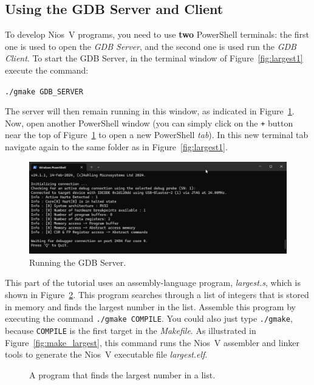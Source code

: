 \documentclass[11pt, twoside, pdftex]{article}
\begin{document}
\subsection{Using the GDB Server and Client}
\label{sec:doit}

To develop Nios~V programs, you need to use {\bf two} PowerShell terminals: the first one
is used to open the {\it GDB Server}, and the second one is used run the {\it GDB Client}. 
To start the GDB Server, in the terminal window of Figure~\ref{fig:largest1} execute the command:

\texttt{./gmake GDB\_SERVER}

The server will then remain running in this window, as indicated in Figure~\ref{fig:server}. 
Now, open another PowerShell window (you can simply click on the \texttt{+} button near the 
top of Figure~\ref{fig:server} to open a new PowerShell {\it tab}). In this new terminal 
tab navigate again to the same folder as in Figure~\ref{fig:largest1}. 

\begin{figure}[h]
    \begin{center}
        \includegraphics[scale=.55]{figures/server.png}
        \caption{Running the GDB Server.}
        \label{fig:server}
    \end{center}
\end{figure}

This part of the tutorial uses an assembly-language program, {\it largest.s}, which is shown 
in Figure~\ref{fig:largest_code}. This program searches through a list of integers that is 
stored in memory and finds the largest number in the list. Assemble this program by 
executing the command \texttt{./gmake COMPILE}.
You could also just type \texttt{./gmake}, because \texttt{COMPILE} is the first target in the 
{\it Makefile}. As illustrated in Figure~\ref{fig:make_largest}, this command runs the Nios~V
assembler and linker tools to generate the Nios~V executable file {\it largest.elf}.

\begin{figure}[H]

	\caption{A program that finds the largest number in a list.}
	\label{fig:largest_code}
\end{figure}
\end{document}
